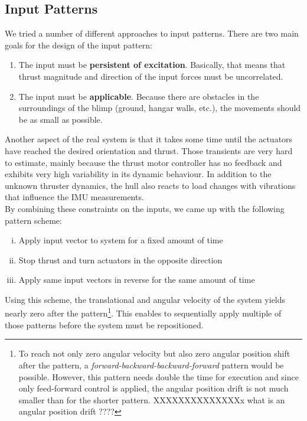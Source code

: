 \subsection{Input Patterns}
\label{sub:input_pattern}
We tried a number of different approaches to input patterns.
There are two main goals for the design of the input pattern:
\begin{enumerate}
\item The input must be \textbf{persistent of excitation}. Basically, that means that thrust magnitude and direction of the input forces must be uncorrelated.
\item The input must be \textbf{applicable}. Because there are obstacles in the surroundings of the blimp (ground, hangar walls, etc.), the movements should be as small as possible.
\end{enumerate}

Another aspect of the real system is that it takes some time until the actuators have reached the desired orientation and thrust.
Those transients are very hard to estimate, mainly because the thrust motor controller has no feedback and exhibits very high variability in its dynamic behaviour.
In addition to the unknown thruster dynamics, the hull also reacts to load changes with vibrations that influence the IMU measurements. \\

By combining these constraints on the inputs, we came up with the following pattern scheme:
\begin{enumerate}[(i)]
\item Apply input vector to system for a fixed amount of time
\item Stop thrust and turn actuators in the opposite direction
\item Apply same input vectors in reverse for the same amount of time
\end{enumerate}
Using this scheme, the translational and angular velocity of the system yields nearly zero after the pattern\footnote{To reach not only zero angular velocity but also zero angular position shift after the pattern, a \textit{forward-backward-backward-forward} pattern would be possible.
However, this pattern needs double the time for execution and since only feed-forward control is applied, the angular position drift is not much smaller than for the shorter pattern.
XXXXXXXXXXXXXXx what is an angular position drift ????
}.
This enables to sequentially apply multiple of those patterns before the system must be repositioned.
\\

